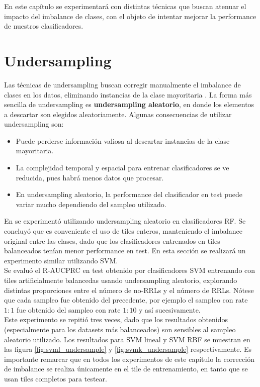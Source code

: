 En este capítulo se experimentará con distintas técnicas que buscan atenuar el impacto del imbalance de clases, con el objeto de intentar mejorar la performance de nuestros clasificadores.

\section{Undersampling}
Las técnicas de undersampling buscan corregir manualmente el imbalance de clases en los datos, eliminando instancias de la clase mayoritaria \cite{nathalie} \cite{he}. La forma más sencilla de undersampling es \textbf{undersampling aleatorio}, en donde los elementos a descartar son elegidos aleatoriamente. Algunas consecuencias de utilizar undersampling son:

\begin{itemize}
\item Puede perderse información valiosa al descartar instancias de la clase mayoritaria.
\item La complejidad temporal y espacial para entrenar clasificadores se ve reducida, pues habrá menos datos que procesar.
\item En undersampling aleatorio, la performance del clasificador en test puede variar mucho dependiendo del sampleo utilizado.
\end{itemize}

En \cite{jbc} se experimentó utilizando undersampling aleatorio en clasificadores RF. Se concluyó que es conveniente el uso de tiles enteros, manteniendo el imbalance original entre las clases, dado que los clasificadores entrenados en tiles balanceados tenían menor performance en test. En esta sección se realizará un experimento similar utilizando SVM. \\

Se evaluó el R-AUCPRC en test obtenido por clasificadores SVM entrenando con tiles artificialmente balancedas usando undersampling aleatorio, explorando distintas proporciones entre el número de no-RRLs y el número de RRLs. Nótese que cada sampleo fue obtenido del precedente, por ejemplo el sampleo con rate $1:1$ fue obtenido del sampleo con rate $1:10$ y así sucesivamente. \\

Este experimento se repitió tres veces, dado que los resultados obtenidos (especialmente para los datasets más balanceados) son sensibles al sampleo aleatorio utilizado. Los resultados para SVM lineal y SVM RBF se muestran en las figura \ref{fig:svml_undersample} y \ref{fig:svmk_undersample} respectivamente. Es importante remarcar que en todos los experimentos de este capítulo la corrección de imbalance se realiza únicamente en el tile de entrenamiento, en tanto que se usan tiles completos para testear. \\

